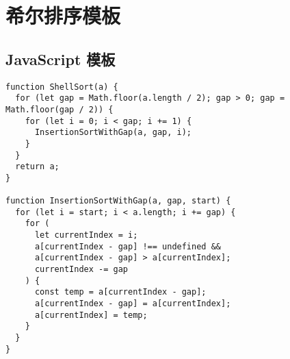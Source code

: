 \newpage
\section{希尔排序模板}

\subsection{JavaScript 模板}

\begin{verbatim}
function ShellSort(a) {
  for (let gap = Math.floor(a.length / 2); gap > 0; gap = Math.floor(gap / 2)) {
    for (let i = 0; i < gap; i += 1) {
      InsertionSortWithGap(a, gap, i);
    }
  }
  return a;
}

function InsertionSortWithGap(a, gap, start) {
  for (let i = start; i < a.length; i += gap) {
    for (
      let currentIndex = i;
      a[currentIndex - gap] !== undefined &&
      a[currentIndex - gap] > a[currentIndex];
      currentIndex -= gap
    ) {
      const temp = a[currentIndex - gap];
      a[currentIndex - gap] = a[currentIndex];
      a[currentIndex] = temp;
    }
  }
}
\end{verbatim}
